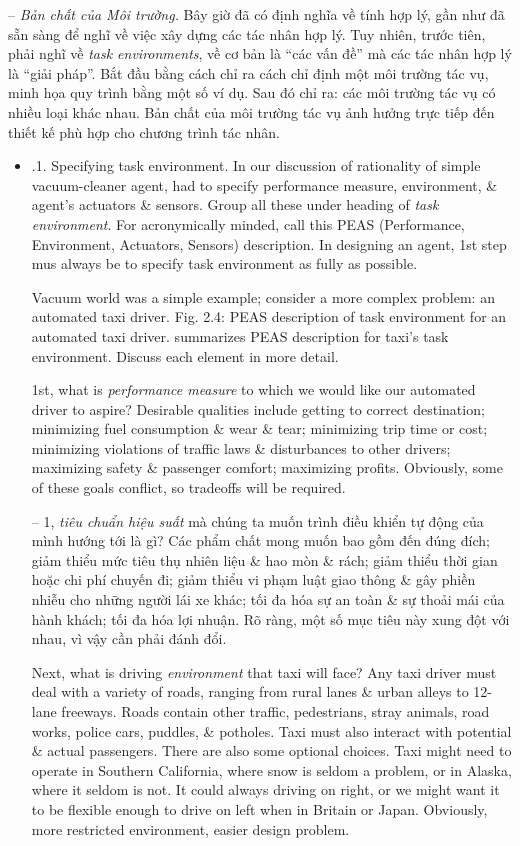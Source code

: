 \documentclass{article}
\begin{document}
\begin{itemize}
\begin{itemize}
\begin{itemize}
			-- {\it Bản chất của Môi trường.} Bây giờ đã có định nghĩa về tính hợp lý, gần như đã sẵn sàng để nghĩ về việc xây dựng các tác nhân hợp lý. Tuy nhiên, trước tiên, phải nghĩ về {\it task environments}, về cơ bản là ``các vấn đề'' mà các tác nhân hợp lý là ``giải pháp''. Bắt đầu bằng cách chỉ ra cách chỉ định một môi trường tác vụ, minh họa quy trình bằng một số ví dụ. Sau đó chỉ ra: các môi trường tác vụ có nhiều loại khác nhau. Bản chất của môi trường tác vụ ảnh hưởng trực tiếp đến thiết kế phù hợp cho chương trình tác nhân.
			\begin{itemize}
				\item {.1. Specifying task environment.} In our discussion of rationality of simple vacuum-cleaner agent, had to specify performance measure, environment, \& agent's actuators \& sensors. Group all these under heading of {\it task environment}. For acronymically minded, call this PEAS (Performance, Environment, Actuators, Sensors) description. In designing an agent, 1st step mus always be to specify task environment as fully as possible.
				
				Vacuum world was a simple example; consider a more complex problem: an automated taxi driver. {\sf Fig. 2.4: PEAS description of task environment for an automated taxi driver.} summarizes PEAS description for taxi's task environment. Discuss each element in more detail.
				
				1st, what is {\it performance measure} to which we would like our automated driver to aspire? Desirable qualities include getting to correct destination; minimizing fuel consumption \& wear \& tear; minimizing trip time or cost; minimizing violations of traffic laws \& disturbances to other drivers; maximizing safety \& passenger comfort; maximizing profits. Obviously, some of these goals conflict, so tradeoffs will be required.
				
				-- 1, {\it tiêu chuẩn hiệu suất} mà chúng ta muốn trình điều khiển tự động của mình hướng tới là gì? Các phẩm chất mong muốn bao gồm đến đúng đích; giảm thiểu mức tiêu thụ nhiên liệu \& hao mòn \& rách; giảm thiểu thời gian hoặc chi phí chuyến đi; giảm thiểu vi phạm luật giao thông \& gây phiền nhiễu cho những người lái xe khác; tối đa hóa sự an toàn \& sự thoải mái của hành khách; tối đa hóa lợi nhuận. Rõ ràng, một số mục tiêu này xung đột với nhau, vì vậy cần phải đánh đổi.
				
				Next, what is driving {\it environment} that taxi will face? Any taxi driver must deal with a variety of roads, ranging from rural lanes \& urban alleys to 12-lane freeways. Roads contain other traffic, pedestrians, stray animals, road works, police cars, puddles, \& potholes. Taxi must also interact with potential \& actual passengers. There are also some optional choices. Taxi might need to operate in Southern California, where snow is seldom a problem, or in Alaska, where it seldom is not. It could always driving on right, or we might want it to be flexible enough to drive on left when in Britain or Japan. Obviously, more restricted environment, easier design problem.
				

\end{itemize}
\end{itemize}
\end{itemize}
\end{itemize}
\end{document}
